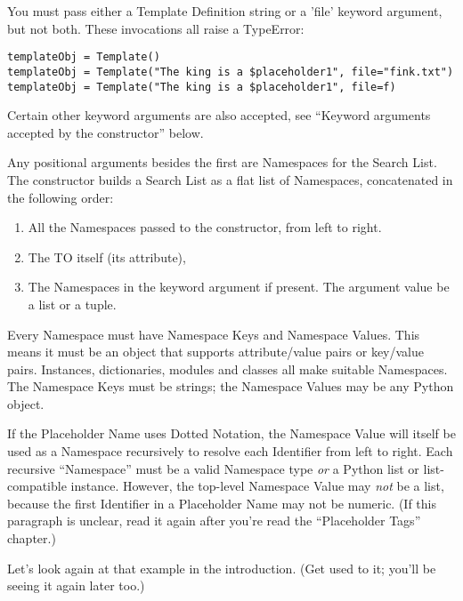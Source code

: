 You must pass either a Template Definition string or a 'file' keyword argument,
but not both.  These invocations all raise a TypeError:

\begin{verbatim}
templateObj = Template() 
templateObj = Template("The king is a $placeholder1", file="fink.txt")
templateObj = Template("The king is a $placeholder1", file=f)
\end{verbatim}

Certain other keyword arguments are also accepted, see 
``Keyword arguments accepted by the constructor'' below.
     
Any positional arguments besides the first are Namespaces for the Search List.
The constructor builds a Search List as a flat list of Namespaces,
concatenated in the following order:

\begin{enumerate}

\item  All the Namespaces passed to the constructor, from left to right.

\item  The TO itself (its  attribute), 

\item  The Namespaces in the keyword argument  if present.  
     The argument value be a list or a tuple.

\end{enumerate}


Every Namespace must have Namespace Keys and Namespace Values.  This means it
must be an object that supports attribute/value pairs or key/value pairs.  
Instances, dictionaries, modules and classes all make suitable Namespaces.
The Namespace Keys must be strings; the Namespace Values may be any Python
object.

If the Placeholder Name uses Dotted Notation, the Namespace Value will itself
be used as a Namespace recursively to resolve each Identifier from left to 
right.  Each recursive ``Namespace'' must be a valid Namespace type 
{\em or} a Python list or list-compatible instance.  However, the top-level
Namespace Value may {\em not} be a list, because the first Identifier in a
Placeholder Name may not be numeric.  (If this paragraph is unclear, read it
again after you're read the ``Placeholder Tags'' chapter.)

Let's look again at that example in the introduction.  (Get used to it; you'll
be seeing it again later too.)

